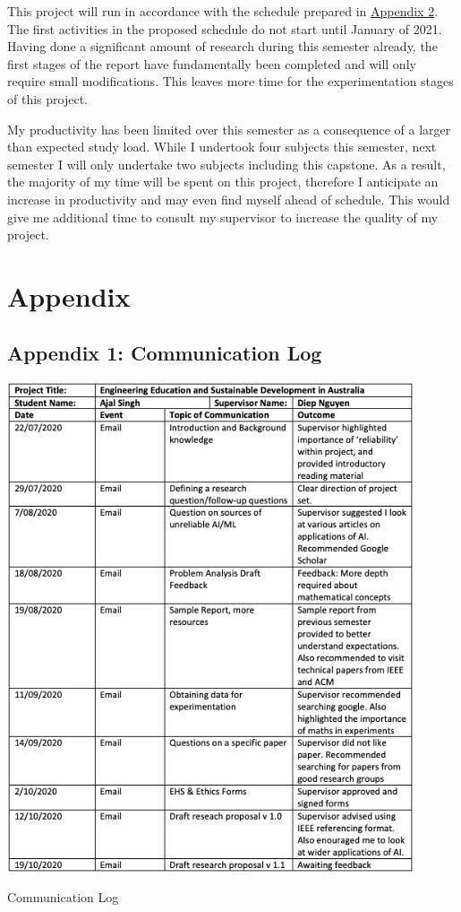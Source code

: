 \documentclass[a4paper,12pt]{report}
\begin{document}
This project will run in accordance with the schedule prepared in \hyperref[sec:app2]{Appendix 2}. The first activities in the proposed schedule do not start until January of 2021. 
Having done a significant amount of research during this semester already, the first stages of the report have fundamentally been completed and will only require small modifications. 
This leaves more time for the experimentation stages of this project.

\newpage
My productivity has been limited over this semester as a consequence of a larger than expected study load. 
While I undertook four subjects this semester, next semester I will only undertake two subjects including this capstone. 
As a result, the majority of my time will be spent on this project, therefore I anticipate an increase in productivity and may even find myself ahead of schedule. 
This would give me additional time to consult my supervisor to increase the quality of my project. 

\renewcommand{\bibname}{References}



\chapter{Appendix}
\section{Appendix 1: Communication Log}
\begin{table}[H]
    \centering
    \includegraphics[width=0.9\textwidth]{communication log.png}
    \caption{Communication Log}
    \label{fig:comm log}
\end{table}
\restoregeometry
\end{document}
